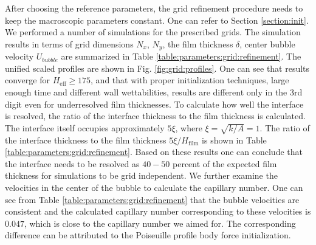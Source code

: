 \documentclass[preprint,12pt]{elsarticle}
\begin{document}
{\color{red} After choosing the reference parameters, the grid refinement procedure
needs to keep the macroscopic parameters constant. One can refer to Section \ref{section:init}.}  
We performed a number of simulations for the prescribed grids. The
simulation results in terms of grid dimensions $N_x$, $N_y$, the film thickness $\delta$, center
bubble
velocity $U_{bubble}$ are summarized in Table \ref{table:parameters:grid:refinement}.
The unified scaled profiles are shown in Fig. \ref{fig:grid:profiles}. One can
see that results converge for $H_{\mathrm{eff}}\geq 175$, and that with proper
initialization techniques, large enough time and different wall
wettabilities, results are different only in the 3rd digit even for
underresolved film thicknesses. To calculate how well the interface is
resolved, the ratio of the interface thickness to the film thickness is calculated. The
interface itself occupies approximately $5 \xi$, where
$\xi=\sqrt{k/A}=1$. The ratio of the interface thickness to the film thickness
$5\xi/H_{\mathrm{film}}$
 is shown in Table \ref{table:parameters:grid:refinement}. Based on these results one can conclude that
 the interface needs to be resolved as $40-50$ percent of the
expected film thickness for simulations to be grid independent. We further examine the
velocities in the center of the bubble to calculate the capillary number. One can see from Table
\ref{table:parameters:grid:refinement} that the bubble velocities are consistent and the
calculated capillary number corresponding to these velocities is $0.047$, which is {\color{red}
close to} the capillary number we aimed for. The corresponding difference can be
attributed to the Poiseuille profile body force initialization.%
\end{document}
